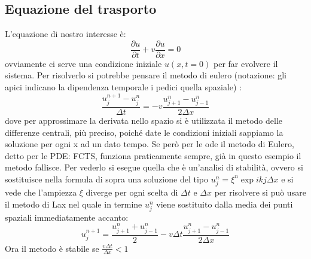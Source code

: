 \documentclass[10pt,a4paper]{article}
\begin{document}
\subsection{Equazione del trasporto}
L'equazione di nostro interesse è:
\[
\frac{\partial u}{\partial t} + v\frac{\partial u}{\partial x}=0
\]
ovviamente ci serve una condizione iniziale $u(x,t=0)$ per far evolvere il sistema. Per risolverlo si potrebbe pensare il metodo di eulero (notazione: gli apici indicano la dipendenza temporale i pedici quella spaziale) :
\[
\frac{u^{n+1}_j - u^n_j}{\Delta t} = - v \frac{u^{n}_{j+1} - u^n_{j-1}}{2 \Delta x}
\]
dove per approssimare la derivata nello spazio si è utilizzata il metodo delle differenze centrali, più preciso, poiché date le condizioni iniziali sappiamo la soluzione per ogni x ad un dato tempo. Se però per le ode il metodo di Eulero, detto per le PDE: FCTS, funziona praticamente sempre, già in questo esempio il metodo fallisce. Per vederlo si esegue quella che è un'analisi di stabilità, ovvero si sostituisce nella formula di sopra una soluzione del tipo $u^n_j=\xi^n \exp{ikj \Delta x}$ e si vede che l'ampiezza $\xi$ diverge per ogni scelta di $\Delta t $ e $\Delta x$ per risolvere si può usare il metodo di Lax nel quale in termine $u^n_j$ viene sostituito dalla media dei punti spaziali immediatamente accanto:
\[
u^{n+1}_j = \frac{u^{n}_{j+1} + u^n_{j-1}}{2} - v \Delta t \frac{u^{n}_{j+1} - u^n_{j-1}}{2 \Delta x}
\]
Ora il metodo è stabile se $\frac{v \Delta t}{\Delta x}<1$ \\
\end{document}

